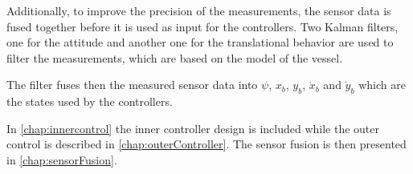 Additionally, to improve the precision of the measurements, the sensor data is fused together before it is used as input for the controllers. Two Kalman filters, one for the attitude and another one for the translational behavior are used to filter the measurements, which are based on the model of the vessel. 
 
The filter fuses then the measured sensor data into $\psi$, $x_{b}$, $y_{b}$, $\dot{x}_{b}$ and $\dot{y}_{b}$ which are the states used by the controllers. 

In \autoref{chap:innercontrol} the inner controller design is included while the outer control is described in \autoref{chap:outerController}. The sensor fusion is then presented in \autoref{chap:sensorFusion}.

